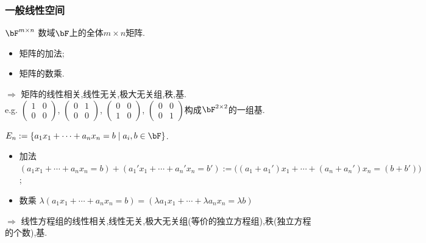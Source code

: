 \begin{frame}\frametitle{一般线性空间}
\begin{example}
$\bF^{m\times n}$ 数域$\bF$上的全体$m\times n$矩阵. \pp
\begin{itemize}
\item 矩阵的加法; \pp
\item 矩阵的数乘. \pp
\end{itemize}
$\Rightarrow$ 矩阵的线性相关,线性无关,极大无关组,秩,基.\pp \\
e.g.
$\begin{pmatrix}1&0\\0&0\end{pmatrix}$,
$\begin{pmatrix}0&1\\0&0\end{pmatrix}$,
$\begin{pmatrix}0&0\\1&0\end{pmatrix}$,
$\begin{pmatrix}0&0\\0&1\end{pmatrix}$构成$\bF^{2\times2}$的一组基.
\end{example}
\pp
\begin{example}
$E_n:=\{a_1x_1+\cdots+a_nx_n=b\mid a_i,b\in \bF\}$.\pp
\begin{itemize}
\item 加法 $(a_1x_1+\cdots+a_nx_n=b)+(a_1'x_1+\cdots+a_n'x_n=b'):=\Big((a_1+a_1')x_1+\cdots+(a_n+a_n')x_n=(b+b')\Big)$;\pp
\item 数乘 $\lambda(a_1x_1+\cdots+a_nx_n=b) = (\lambda a_1x_1+\cdots+\lambda a_nx_n=\lambda b)$\pp
\end{itemize}
$\Rightarrow$ 线性方程组的线性相关,线性无关,极大无关组(等价的独立方程组),秩(独立方程的个数),基.
\end{example}
\end{frame}





